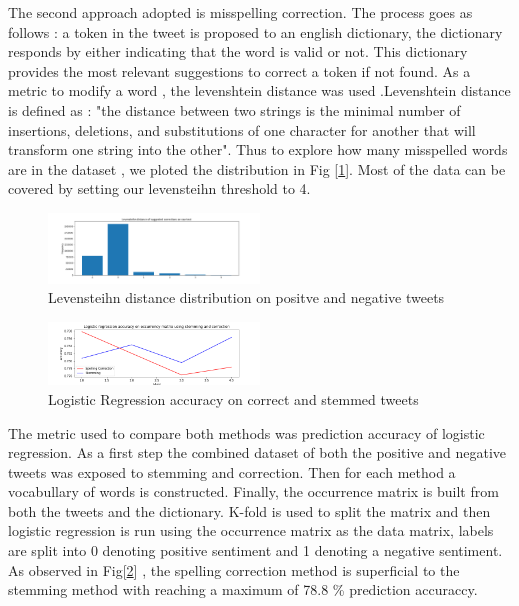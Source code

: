 \documentclass[10pt,conference,compsocconf]{IEEEtran}
\begin{document}
The second approach adopted is misspelling correction. The process goes as follows : a token in the tweet is proposed to an english dictionary, the dictionary responds by either indicating that the word is valid or not. This dictionary provides the most relevant suggestions to correct a token if not found. As a metric to modify a word , the levenshtein distance was used .Levenshtein distance is defined as : "the distance between two strings is the minimal number of insertions, deletions, and substitutions of one character for another that will transform one string into the other". Thus to explore how many misspelled words are in the dataset , we ploted the distribution in Fig [\ref{levDistA}]. Most of the data can be covered by setting our levensteihn threshold to 4.
\begin{figure}[!htb]
	\centering \includegraphics[width=0.5\textwidth]{../plots/distributionA.png}
	\caption{Levensteihn distance distribution on positve and negative tweets}
	\label{levDistA}
\end{figure}

\begin{figure}[!htb]
	\centering \includegraphics[width=0.5\textwidth]{../plots/raw.png}
	\caption{Logistic Regression accuracy on correct and stemmed tweets}
	\label{raw}
\end{figure}

The metric used to compare both methods was prediction accuracy of logistic regression. As a first step the combined dataset of both the positive and negative tweets was exposed to stemming and correction. Then for each method a vocabullary of words is constructed. Finally, the occurrence matrix is built from both the tweets and the dictionary. K-fold is used to split the matrix and then logistic regression is run using the occurrence matrix as the data matrix, labels are split into 0 denoting positive sentiment and 1 denoting a negative sentiment.  As observed in Fig[\ref{raw}] , the spelling correction method is superficial to the stemming method with reaching a maximum of 78.8 \% prediction accuraccy.
\end{document}
